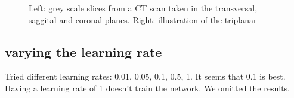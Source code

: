 \begin{figure}
\centering
\begin{minipage}{0.45\textwidth}
\centering
{}
\end{minipage}\hfill
\hspace{-1cm}
\begin{minipage}{0.45\textwidth}
\centering
{}
\end{minipage}
\caption{Left: grey scale slices from a CT scan taken in the transversal, saggital and coronal planes. Right: illustration of the triplanar}
\end{figure}


\subsection{varying the learning rate}

Tried different learning rates: 0.01, 0.05, 0.1, 0.5, 1. It seems that 0.1 is best. Having a learning rate of 1 doesn't train the network.  We omitted the results.

